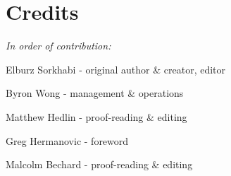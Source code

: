 \cleardoublepage
\chapter{Credits}
\label{ch:14}


\begin{fullwidth}

\textit{In order of contribution:}

Elburz Sorkhabi - original author \& creator, editor

Byron Wong - management \& operations

Matthew Hedlin - proof-reading \& editing

Greg Hermanovic - foreword

Malcolm Bechard - proof-reading \& editing
 

\end{fullwidth}


